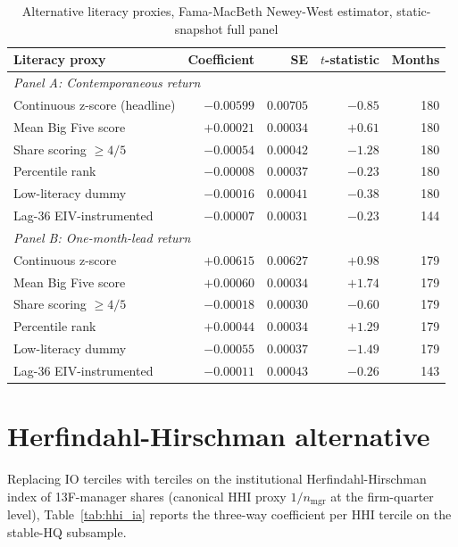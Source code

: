 \documentclass[12pt]{article}
\begin{document}
\begin{table}[h]
\centering
\caption{Alternative literacy proxies, Fama-MacBeth Newey-West estimator, static-snapshot full panel}
\footnotesize
\begin{tabular}{lrrrr}
\toprule
Literacy proxy & Coefficient & SE & $t$-statistic & Months \\
\midrule
\multicolumn{5}{l}{\textit{Panel A: Contemporaneous return}}\\
Continuous z-score (headline)        & $-0.00599$ & $0.00705$ & $-0.85$ & 180 \\
Mean Big Five score                  & $+0.00021$ & $0.00034$ & $+0.61$ & 180 \\
Share scoring $\geq 4/5$             & $-0.00054$ & $0.00042$ & $-1.28$ & 180 \\
Percentile rank                      & $-0.00008$ & $0.00037$ & $-0.23$ & 180 \\
Low-literacy dummy                   & $-0.00016$ & $0.00041$ & $-0.38$ & 180 \\
Lag-36 EIV-instrumented              & $-0.00007$ & $0.00031$ & $-0.23$ & 144 \\
\midrule
\multicolumn{5}{l}{\textit{Panel B: One-month-lead return}}\\
Continuous z-score                   & $+0.00615$ & $0.00627$ & $+0.98$ & 179 \\
Mean Big Five score                  & $+0.00060$ & $0.00034$ & $+1.74$ & 179 \\
Share scoring $\geq 4/5$             & $-0.00018$ & $0.00030$ & $-0.60$ & 179 \\
Percentile rank                      & $+0.00044$ & $0.00034$ & $+1.29$ & 179 \\
Low-literacy dummy                   & $-0.00055$ & $0.00037$ & $-1.49$ & 179 \\
Lag-36 EIV-instrumented              & $-0.00011$ & $0.00043$ & $-0.26$ & 143 \\
\bottomrule
\end{tabular}
\end{table}

\section{Herfindahl-Hirschman alternative}
\label{ia:hhi}

Replacing IO terciles with terciles on the institutional Herfindahl-Hirschman index of 13F-manager shares (canonical HHI proxy $1/n_{\text{mgr}}$ at the firm-quarter level), Table~\ref{tab:hhi_ia} reports the three-way coefficient per HHI tercile on the stable-HQ subsample.
\end{document}
